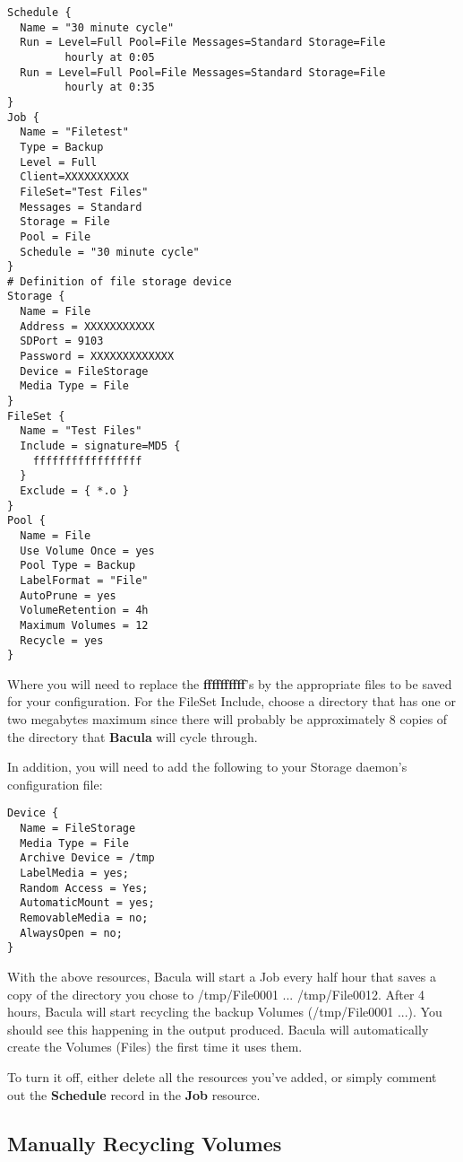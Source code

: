 \footnotesize
\begin{verbatim}
Schedule {
  Name = "30 minute cycle"
  Run = Level=Full Pool=File Messages=Standard Storage=File
         hourly at 0:05
  Run = Level=Full Pool=File Messages=Standard Storage=File
         hourly at 0:35
}
Job {
  Name = "Filetest"
  Type = Backup
  Level = Full
  Client=XXXXXXXXXX
  FileSet="Test Files"
  Messages = Standard
  Storage = File
  Pool = File
  Schedule = "30 minute cycle"
}
# Definition of file storage device
Storage {
  Name = File
  Address = XXXXXXXXXXX
  SDPort = 9103
  Password = XXXXXXXXXXXXX
  Device = FileStorage
  Media Type = File
}
FileSet {
  Name = "Test Files"
  Include = signature=MD5 {
    fffffffffffffffff
  }
  Exclude = { *.o }
}
Pool {
  Name = File
  Use Volume Once = yes
  Pool Type = Backup
  LabelFormat = "File"
  AutoPrune = yes
  VolumeRetention = 4h
  Maximum Volumes = 12
  Recycle = yes
}
\end{verbatim}
\normalsize

Where you will need to replace the {\bf ffffffffff}'s by the appropriate files
to be saved for your configuration. For the FileSet Include, choose a
directory that has one or two megabytes maximum since there will probably be
approximately 8 copies of the directory that {\bf Bacula} will cycle through. 

In addition, you will need to add the following to your Storage daemon's
configuration file: 

\footnotesize
\begin{verbatim}
Device {
  Name = FileStorage
  Media Type = File
  Archive Device = /tmp
  LabelMedia = yes;
  Random Access = Yes;
  AutomaticMount = yes;
  RemovableMedia = no;
  AlwaysOpen = no;
}
\end{verbatim}
\normalsize

With the above resources, Bacula will start a Job every half hour that saves a
copy of the directory you chose to /tmp/File0001 ... /tmp/File0012. After 4
hours, Bacula will start recycling the backup Volumes (/tmp/File0001 ...). You
should see this happening in the output produced. Bacula will automatically
create the Volumes (Files) the first time it uses them. 

To turn it off, either delete all the resources you've added, or simply
comment out the {\bf Schedule} record in the {\bf Job} resource. 

\subsection*{Manually Recycling Volumes}
\label{manualrecycling}

